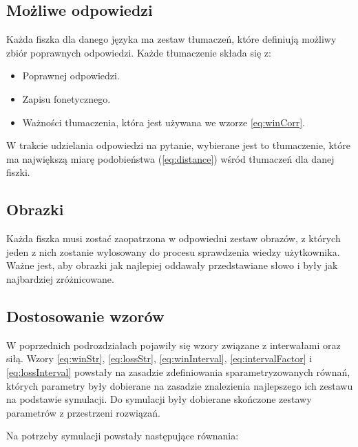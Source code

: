 \subsection{Możliwe odpowiedzi}

Każda fiszka dla danego języka ma zestaw tłumaczeń, które definiują możliwy zbiór poprawnych odpowiedzi. Każde tłumaczenie składa się z:
\begin{itemize}
	\item Poprawnej odpowiedzi.
	\item Zapisu fonetycznego.
	\item Ważności tłumaczenia, która jest używana we wzorze \ref{eq:winCorr}.
\end{itemize}
W trakcie udzielania odpowiedzi na pytanie, wybierane jest to tłumaczenie, które ma największą miarę podobieństwa (\ref{eq:distance}) wśród tłumaczeń dla danej fiszki.

\subsection{Obrazki}

Każda fiszka musi zostać zaopatrzona w odpowiedni zestaw obrazów, z których jeden z nich zostanie wylosowany do procesu sprawdzenia wiedzy użytkownika. Ważne jest, aby obrazki jak najlepiej oddawały przedstawiane słowo i były jak najbardziej zróżnicowane.

\subsection{Dostosowanie wzorów}

W poprzednich podrozdziałach pojawiły się wzory związane z interwałami oraz siłą. Wzory \ref{eq:winStr}, \ref{eq:lossStr}, \ref{eq:winInterval}, \ref{eq:intervalFactor} i \ref{eq:lossInterval} powstały na zasadzie zdefiniowania sparametryzowanych równań, których parametry były dobierane na zasadzie znalezienia najlepszego ich zestawu na podstawie symulacji. Do symulacji były dobierane skończone zestawy parametrów z przestrzeni rozwiązań.

Na potrzeby symulacji powstały następujące równania:



